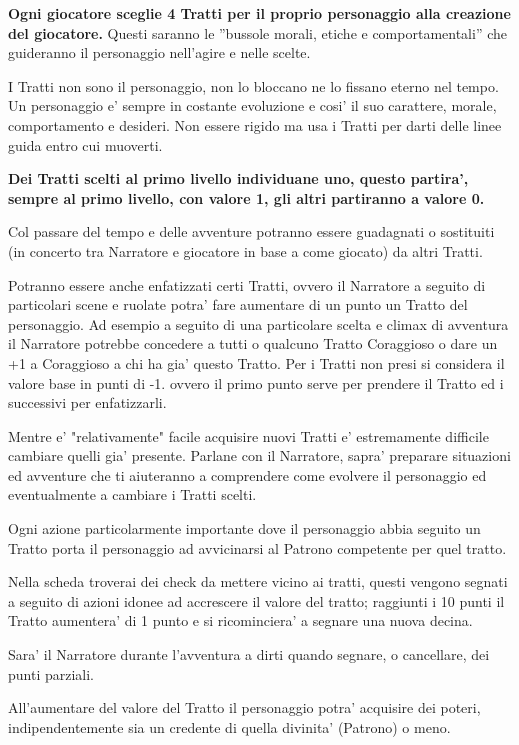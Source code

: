 \documentclass[a4paper,11pt,twoside,openany]{book}
\begin{document}
\textbf{Ogni giocatore sceglie 4 Tratti per il proprio personaggio alla creazione del giocatore.} Questi saranno le ''bussole morali, etiche e comportamentali'' che guideranno il personaggio nell'agire e nelle scelte.

I Tratti non sono il personaggio, non lo bloccano ne lo fissano eterno nel tempo. Un personaggio e' sempre in costante evoluzione e cosi' il suo carattere, morale, comportamento e desideri. Non essere rigido ma usa i Tratti per darti delle linee guida entro cui muoverti.

\textbf{Dei Tratti scelti al primo livello individuane uno, questo partira', sempre al primo livello, con valore 1, gli altri partiranno a valore 0.}

Col passare del tempo e delle avventure potranno essere guadagnati o sostituiti (in concerto tra Narratore e giocatore in base a come giocato) da altri Tratti.

Potranno essere anche enfatizzati certi Tratti, ovvero il Narratore a seguito di particolari scene e ruolate potra' fare aumentare di un punto un Tratto del personaggio. Ad esempio a seguito di una particolare scelta e climax di avventura il Narratore potrebbe concedere a tutti o qualcuno Tratto Coraggioso o dare un +1 a Coraggioso a chi ha gia' questo Tratto. Per i Tratti non presi si considera il valore base in punti di -1. ovvero il primo punto serve per prendere il Tratto ed i successivi per enfatizzarli.

Mentre e' "relativamente" facile acquisire nuovi Tratti e' estremamente difficile cambiare quelli gia' presente. Parlane con il Narratore, sapra' preparare situazioni ed avventure che ti aiuteranno a comprendere come evolvere il personaggio ed eventualmente a cambiare i Tratti scelti.

Ogni azione particolarmente importante dove il personaggio abbia seguito un Tratto porta il personaggio ad avvicinarsi al Patrono competente per quel tratto.

Nella scheda troverai dei check da mettere vicino ai tratti, questi vengono segnati a seguito di azioni idonee ad accrescere il valore del tratto; raggiunti i 10 punti il Tratto aumentera' di 1 punto e si ricominciera' a segnare una nuova decina.

Sara' il Narratore durante l'avventura a dirti quando segnare, o cancellare, dei punti parziali.

All'aumentare del valore del Tratto il personaggio potra' acquisire dei poteri, indipendentemente sia un credente di quella divinita' (Patrono) o meno.
\end{document}
